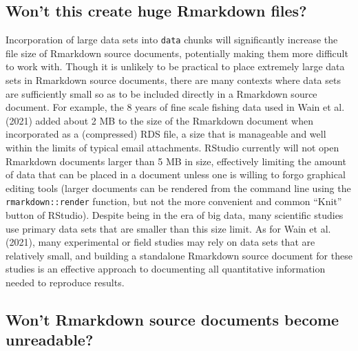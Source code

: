 \hypertarget{filesize}{%
\subsection{Won't this create huge Rmarkdown files?}\label{filesize}}

Incorporation of large data sets into \texttt{data} chunks will significantly increase the file size of Rmarkdown source documents, potentially making them more difficult to work with. Though it is unlikely to be practical to place extremely large data sets in Rmarkdown source documents, there are many contexts where data sets are sufficiently small so as to be included directly in a Rmarkdown source document. For example, the 8 years of fine scale fishing data used in Wain et al. (2021) added about 2 MB to the size of the Rmarkdown document when incorporated as a (compressed) RDS file, a size that is manageable and well within the limits of typical email attachments. RStudio currently will not open Rmarkdown documents larger than 5 MB in size, effectively limiting the amount of data that can be placed in a document unless one is willing to forgo graphical editing tools (larger documents can be rendered from the command line using the \texttt{rmarkdown::render} function, but not the more convenient and common ``Knit'' button of RStudio). Despite being in the era of big data, many scientific studies use primary data sets that are smaller than this size limit. As for Wain et al. (2021), many experimental or field studies may rely on data sets that are relatively small, and building a standalone Rmarkdown source document for these studies is an effective approach to documenting all quantitative information needed to reproduce results.

\hypertarget{readable}{%
\subsection{Won't Rmarkdown source documents become unreadable?}\label{readable}}

